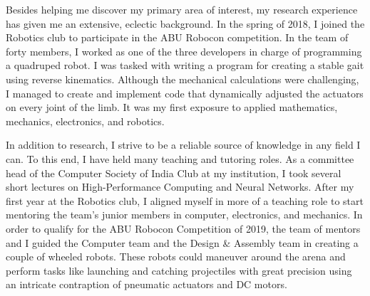 \documentclass{article}
\begin{document}
Besides helping me discover my primary area of interest, my research experience
has given me an extensive, eclectic background. In the spring of 2018, I joined
the Robotics club to participate in the ABU Robocon competition. In the team of
forty members, I worked as one of the three developers in charge of programming
a quadruped robot. I was tasked with writing a program for creating a stable
gait using reverse kinematics. Although the mechanical calculations were
challenging, I managed to create and implement code that dynamically adjusted
the actuators on every joint of the limb. It was my first exposure to applied
mathematics, mechanics, electronics, and robotics. 
\vspace{6pt}

In addition to research, I strive to be a reliable source of knowledge in any
field I can. To this end, I have held many teaching and tutoring roles. As a
committee head of the Computer Society of India Club at my institution, I took
several short lectures on High-Performance Computing and Neural Networks. After
my first year at the Robotics club, I aligned myself in more of a teaching role
to start mentoring the team's junior members in computer, electronics, and
mechanics. In order to qualify for the ABU Robocon Competition of 2019, the
team of mentors and I guided the Computer team and the Design \& Assembly team
in creating a couple of wheeled robots. These robots could maneuver around the
arena and perform tasks like launching and catching projectiles with great
precision using an intricate contraption of pneumatic actuators and DC motors. 
\vspace{6pt}
\end{document}
